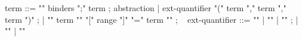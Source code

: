 \begin{syntax}
term ::= { "\lambda" binders ";" term } ; abstraction
| { ext-quantifier "(" term "," term "," term ")" };
| { "{" term "\with" "[" range "]" "=" term "}" } ;
\
{ ext-quantifier } ::= { "\max" } | { "\min" } | { "\sum" };
                       | { "\product" } | { "\numof" }
\end{syntax}
